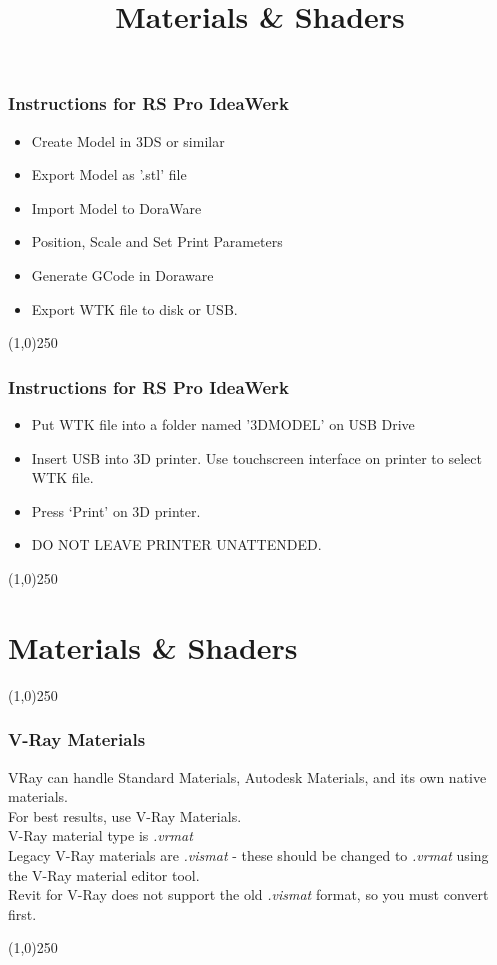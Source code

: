 \begin{frame}
\frametitle{Instructions for RS Pro IdeaWerk}
\begin{itemize}
	\item Create Model in 3DS or similar
	\item Export Model as '.stl' file
	\item Import Model to DoraWare
	\item Position, Scale and Set Print Parameters
	\item Generate GCode in Doraware
	\item Export WTK file to disk or USB.
\end{itemize}
\end{frame}
\begin{center}\line(1,0){250}\end{center}


\begin{frame}
\frametitle{Instructions for RS Pro IdeaWerk}
\begin{itemize}
	\item Put WTK file into a folder named '3DMODEL' on USB Drive
	\item Insert USB into 3D printer. Use touchscreen interface on printer to select WTK file.
	\item Press `Print' on 3D printer.
	\item DO NOT LEAVE PRINTER UNATTENDED.
\end{itemize}
\end{frame}
\begin{center}\line(1,0){250}\end{center}





\section{Materials \& Shaders}
\begin{frame}
\title[Materials \& Shaders]{Materials \& Shaders}
\titlepage
\end{frame}\begin{center}\line(1,0){250}\end{center}




\begin{frame}
	\frametitle{V-Ray Materials}
	VRay can handle Standard Materials, Autodesk Materials, and its own native materials.\\
	For best results, use V-Ray Materials.\\
	V-Ray material type is \textit{.vrmat}\\
	Legacy V-Ray materials are \textit{.vismat} - these should be changed to \textit{.vrmat} using the V-Ray material editor tool.\\
	Revit for V-Ray does not support the old \textit{.vismat} format, so you must convert first.
\end{frame}
\begin{center}\line(1,0){250}\end{center}


